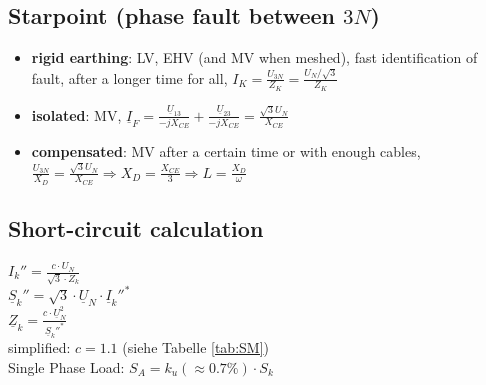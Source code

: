 	\begin{multicols}{2}
		\subsection{Starpoint (phase fault between $3N$)}
		\begin{itemize}
			\setlength{\itemsep}{0pt}
			\item \textbf{rigid earthing}: LV, EHV (and MV when meshed), fast identification of fault, after a longer time for all, $I_K = \frac{U_{3N}}{Z_K} = \frac{U_N/\sqrt{3}}{Z_K}$
			\item \textbf{isolated}: MV, $\underline{I}_F = \frac{\underline{U}_{13}}{-jX_{CE}} + \frac{\underline{U}_{23}}{-jX_{CE}} = \frac{\sqrt{3}U_N}{X_{CE}}$
			\item \textbf{compensated}: MV after a certain time or with enough cables, $\frac{U_{3N}}{X_D} = \frac{\sqrt{3} U_N}{X_{CE}} \Rightarrow X_D = \frac{X_{CE}}{3} \Rightarrow L = \frac{X_D}{\omega}$ 
		\end{itemize}
		
		\subsection{Short-circuit calculation}
		$I_k'' = \frac{c \cdot U_N}{\sqrt{3} \cdot Z_k}$\\
		$\underline{S}_k'' = \sqrt{3} \cdot \underline{U}_N \cdot \underline{I}_k''^*$ \\
		$\underline{Z}_k = \frac{c \cdot \underline{U}_N^2}{\underline{S}_k''^*}$\\ 
		simplified: $c = 1.1$ (siehe Tabelle \ref{tab:SM}) \\
		Single Phase Load: $S_A = k_u (\approx 0.7 \%)\cdot S_k$

	\end{multicols}